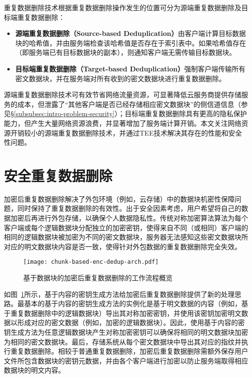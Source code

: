 重复数据删除技术根据重复数据删除操作发生的位置可分为源端重复数据删除及目标端重复数据删除\cite{IDC2010Data}：

\begin{itemize}
    \item \textbf{源端重复数据删除（Source-based Deduplication）}由客户端计算目标数据块的哈希值，并由服务端检查该哈希值是否存在于索引表中。如果哈希值存在（即服务端已有目标数据块的副本），则通知客户端无需传输目标数据块。
    \item \textbf{目标端重复数据删除（Target-based Deduplication）}强制客户端传输所有密文数据块，并在服务端对所有收到的密文数据块进行重复数据删除。
\end{itemize}

源端重复数据删除技术可有效节省网络流量资源，可显著降低云服务商提供存储服务的成本，但泄露了“其他客户端是否已经存储相应密文数据块”的侧信道信息（参见\S\ref{subsubsec:intro-problem-security}）；目标端重复数据删除具有更高的隐私保护能力，但产生大量网络资源浪费，并显著增加了服务端计算开销。本文关注网络资源开销较小的源端重复数据删除技术，并通过TEE技术解决其存在的性能和安全性问题。

\section{安全重复数据删除}
\label{sec:background-enc-deduplication}

加密后重复数据删除解决了外包环境（例如，云存储）中的数据块机密性保障问题，同时保持了重复数据删除的有效性。出于安全因素考虑，用户希望将自己的数据加密后再进行外包存储，以确保个人数据隐私性。传统对称加密算法算法为每个客户端或每个逻辑数据块分配独立的加密密钥，使得来自不同（或相同）客户端的相同的逻辑数据块被加密为不同的密文数据块，服务器无法感知这些密文数据块所对应的明文数据块内容是否一致，使得针对外包数据的重复数据删除完全失效。

\begin{figure}[!htb]
    \small
    \centering
    \texttt{[image: chunk-based-enc-dedup-arch.pdf]}
    \caption{基于数据块的加密后重复数据删除的工作流程概览} 
    \label{fig:chunk-based-enc-dedup-flow}
\end{figure}

如图~\ref{fig:chunk-based-enc-dedup-flow}所示，基于内容的密钥生成方法给加密后重复数据删除提供了新的处理思路。最基本的基于内容的密钥生成方法的实例化是基于明文数据的内容（例如，基于重复数据删除中的逻辑数据块）导出其对称加密密钥，并使用该密钥加密明文数据以形成对应的密文数据（例如，加密的逻辑数据块）。因此，使用基于内容的密钥生成方法为任意逻辑数据块产生对称加密密钥可以确保将相同的明文数据块加密为相同的密文数据块。最后，存储系统从每个密文数据块中导出其对应的指纹并执行重复数据删除。相较于普通重复数据删除，加密后重复数据删除需额外保存用户文件所包含数据块的密钥元数据，并由各个客户端进行加密以防止服务端取得相应数据块的明文内容。

